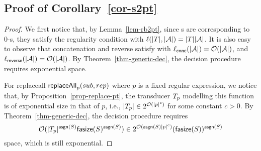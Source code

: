 



\subsection{Proof of Corollary~\ref{cor-s2pt}}
%
\begin{proof}
We first notice that, by Lemma~\ref{lem-rb2pt}, since \FT{}s are corresponding to 0-\RBPPT{}s, they satisfy the regularity condition \prerec{} with  $\ell(|T|, |\mathcal{A}|) = |T||\mathcal{A}|$. It is also easy to observe that concatenation and reverse satisfy  \prerec{} with  $\ell_{\sf conc}(|\mathcal{A}|) = \mathcal{O}(|\mathcal{A}|)$, and $\ell_{\sf reverse}(|\mathcal{A}|) = \mathcal{O}(|\mathcal{A}|)$. By Theorem~\ref{thm-generic-dec}, the decision procedure requires exponential space. 

For replaceall  $\mathsf{replaceAll}_{p}(sub, rep)$ where $p$ is a fixed regular expression, we notice that, by Proposition~\ref{prop-replace-pt}, the transducer $T_p$ modelling this function is of exponential size in that of $p$, i.e., $|T_p| \in 2^{\mathcal{O}(|p|^c)}$ for some constant $c > 0$. By Theorem~\ref{thm-generic-dec}, the decision procedure requires
$$\mathcal{O}(|T_p|^{\mathsf{asgn}(S)} \mathsf{fasize}(S)^{\mathsf{asgn}(S)}) \in 2^{\mathcal{O}(\mathsf{asgn}(S) |p|^{c})} (\mathsf{fasize}(S))^{\mathsf{asgn}(S)}$$ 
space, which is still exponential.  
%
%
\end{proof}









